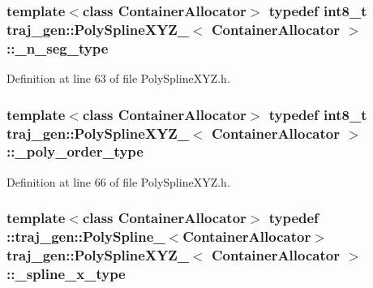 \subsubsection[{\texorpdfstring{\+\_\+n\+\_\+seg\+\_\+type}{_n_seg_type}}]{\setlength{\rightskip}{0pt plus 5cm}template$<$class Container\+Allocator$>$ typedef int8\+\_\+t {\bf traj\+\_\+gen\+::\+Poly\+Spline\+X\+Y\+Z\+\_\+}$<$ Container\+Allocator $>$\+::{\bf \+\_\+n\+\_\+seg\+\_\+type}}\hypertarget{structtraj__gen_1_1_poly_spline_x_y_z___a452de517e162fa10990a02f034732870}{}\label{structtraj__gen_1_1_poly_spline_x_y_z___a452de517e162fa10990a02f034732870}


Definition at line 63 of file Poly\+Spline\+X\+Y\+Z.\+h.

\subsubsection[{\texorpdfstring{\+\_\+poly\+\_\+order\+\_\+type}{_poly_order_type}}]{\setlength{\rightskip}{0pt plus 5cm}template$<$class Container\+Allocator$>$ typedef int8\+\_\+t {\bf traj\+\_\+gen\+::\+Poly\+Spline\+X\+Y\+Z\+\_\+}$<$ Container\+Allocator $>$\+::{\bf \+\_\+poly\+\_\+order\+\_\+type}}\hypertarget{structtraj__gen_1_1_poly_spline_x_y_z___a1f81e518c61dd409be0b2456eff1797b}{}\label{structtraj__gen_1_1_poly_spline_x_y_z___a1f81e518c61dd409be0b2456eff1797b}


Definition at line 66 of file Poly\+Spline\+X\+Y\+Z.\+h.

\subsubsection[{\texorpdfstring{\+\_\+spline\+\_\+x\+\_\+type}{_spline_x_type}}]{\setlength{\rightskip}{0pt plus 5cm}template$<$class Container\+Allocator$>$ typedef \+::{\bf traj\+\_\+gen\+::\+Poly\+Spline\+\_\+}$<$Container\+Allocator$>$ {\bf traj\+\_\+gen\+::\+Poly\+Spline\+X\+Y\+Z\+\_\+}$<$ Container\+Allocator $>$\+::{\bf \+\_\+spline\+\_\+x\+\_\+type}}\hypertarget{structtraj__gen_1_1_poly_spline_x_y_z___abc3e93287ad8086e17f90af36bba6f1d}{}\label{structtraj__gen_1_1_poly_spline_x_y_z___abc3e93287ad8086e17f90af36bba6f1d}


